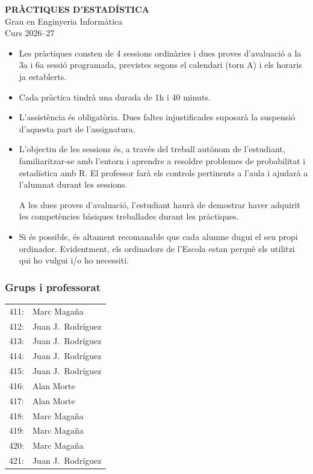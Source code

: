 \documentclass[11pt,a4paper]{article}
\begin{document}
\begin{center}
 {\textbf{PRÀCTIQUES D'ESTADÍSTICA}\\[0.5em]
\large Grau en Enginyeria Informàtica\\
Curs 2026--27}
\end{center}


\begin{itemize}
    \item Les pràctiques consten de 4 sessions ordinàries i dues proves d'avaluació a la 3a i 6a sessió programada, previstes segons el calendari (torn A) i els horaris ja establerts.

    \item Cada pràctica tindrà una durada de 1h i 40 minuts.

    \item L'assistència és obligatòria. Dues faltes injustificades suposarà la suspensió d'aquesta part de l'assignatura.

    \item L'objectiu de les sessions és, a través del treball autònom de l'estudiant, familiaritzar-se amb l'entorn i aprendre a resoldre problemes de probabilitat i estadística amb R. El professor farà els controls pertinents a l'aula i ajudarà a l'alumnat durant les sessions.

    A les dues proves d'avaluació, l'estudiant haurà de demostrar haver adquirit les competències bàsiques treballades durant les pràctiques.

    \item Si és possible, és altament recomanable que cada alumne dugui el seu propi ordinador. Evidentment, els ordinadors de l'Escola estan perquè els utilitzi qui ho vulgui i/o ho necessiti.
\end{itemize}

\subsubsection*{Grups i professorat}

\begin{tabular}{ll}
411: & Marc Magaña\\
412: & Juan J.~Rodríguez\\
413: & Juan J.~Rodríguez\\
414: & Juan J.~Rodríguez\\
415: &  Juan J.~Rodríguez\\
416: & Alan Morte\\
417: & Alan Morte\\
418: & Marc Magaña\\
419: & Marc Magaña\\
420: & Marc Magaña\\
421: & Juan J.~Rodríguez
\end{tabular}
\end{document}

